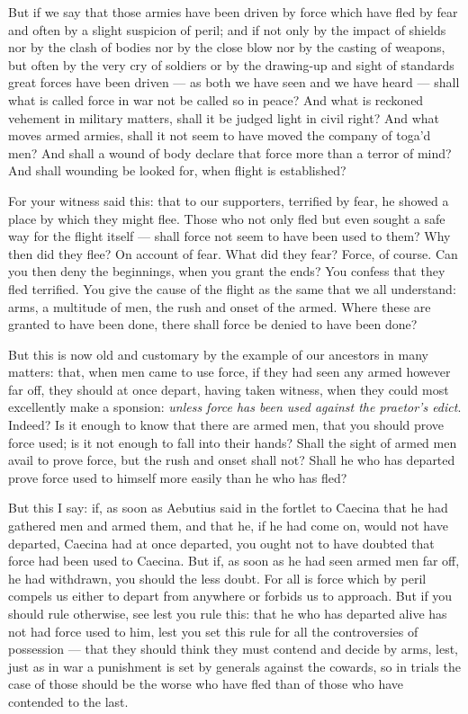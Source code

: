  But if we say that those armies have been driven by force which have fled by fear and often by a slight suspicion of peril; and if not only by the impact of shields nor by the clash of bodies nor by the close blow nor by the casting of weapons, but often by the very cry of soldiers or by the drawing-up and sight of standards great forces have been driven --- as both we have seen and we have heard --- shall what is called force in war not be called so in peace? And what is reckoned vehement in military matters, shall it be judged light in civil right? And what moves armed armies, shall it not seem to have moved the company of toga'd men? And shall a wound of body declare that force more than a terror of mind? And shall wounding be looked for, when flight is established?

 For your witness said this: that to our supporters, terrified by fear, he showed a place by which they might flee. Those who not only fled but even sought a safe way for the flight itself --- shall force not seem to have been used to them? Why then did they flee? On account of fear. What did they fear? Force, of course. Can you then deny the beginnings, when you grant the ends? You confess that they fled terrified. You give the cause of the flight as the same that we all understand: arms, a multitude of men, the rush and onset of the armed. Where these are granted to have been done, there shall force be denied to have been done?

 But this is now old and customary by the example of our ancestors in many matters: that, when men came to use force, if they had seen any armed however far off, they should at once depart, having taken witness, when they could most excellently make a sponsion: \textit{unless force has been used against the praetor's edict}. Indeed? Is it enough to know that there are armed men, that you should prove force used; is it not enough to fall into their hands? Shall the sight of armed men avail to prove force, but the rush and onset shall not? Shall he who has departed prove force used to himself more easily than he who has fled?

 But this I say: if, as soon as Aebutius said in the fortlet to Caecina that he had gathered men and armed them, and that he, if he had come on, would not have departed, Caecina had at once departed, you ought not to have doubted that force had been used to Caecina. But if, as soon as he had seen armed men far off, he had withdrawn, you should the less doubt. For all is force which by peril compels us either to depart from anywhere or forbids us to approach. But if you should rule otherwise, see lest you rule this: that he who has departed alive has not had force used to him, lest you set this rule for all the controversies of possession --- that they should think they must contend and decide by arms, lest, just as in war a punishment is set by generals against the cowards, so in trials the case of those should be the worse who have fled than of those who have contended to the last.

